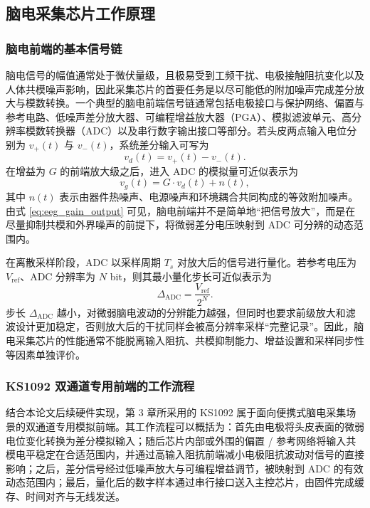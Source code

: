 \subsection{脑电采集芯片工作原理}

\subsubsection{脑电前端的基本信号链}

脑电信号的幅值通常处于微伏量级，且极易受到工频干扰、电极接触阻抗变化以及人体共模噪声影响，因此采集芯片的首要任务是以尽可能低的附加噪声完成差分放大与模数转换。一个典型的脑电前端信号链通常包括电极接口与保护网络、偏置与参考电路、低噪声差分放大器、可编程增益放大器（PGA）、模拟滤波单元、高分辨率模数转换器（ADC）以及串行数字输出接口等部分。若头皮两点输入电位分别为 $v_+(t)$ 与 $v_-(t)$，系统差分输入可写为
\begin{equation}
v_d(t) = v_+(t) - v_-(t).
\label{eq:eeg_diff_input}
\end{equation}
在增益为 $G$ 的前端放大级之后，进入 ADC 的模拟量可近似表示为
\begin{equation}
v_g(t) = G \cdot v_d(t) + n(t),
\label{eq:eeg_gain_output}
\end{equation}
其中 $n(t)$ 表示由器件热噪声、电源噪声和环境耦合共同构成的等效附加噪声。由式 \eqref{eq:eeg_gain_output} 可见，脑电前端并不是简单地“把信号放大”，而是在尽量抑制共模和外界噪声的前提下，将微弱差分电压映射到 ADC 可分辨的动态范围内。

在离散采样阶段，ADC 以采样周期 $T_s$ 对放大后的信号进行量化。若参考电压为 $V_{\mathrm{ref}}$、ADC 分辨率为 $N$ bit，则其最小量化步长可近似表示为
\begin{equation}
\Delta_{\mathrm{ADC}} = \frac{V_{\mathrm{ref}}}{2^N}.
\label{eq:adc_lsb}
\end{equation}
步长 $\Delta_{\mathrm{ADC}}$ 越小，对微弱脑电波动的分辨能力越强，但同时也要求前级放大和滤波设计更加稳定，否则放大后的干扰同样会被高分辨率采样“完整记录”。因此，脑电采集芯片的性能通常不能脱离输入阻抗、共模抑制能力、增益设置和采样同步性等因素单独评价。

\subsubsection{KS1092 双通道专用前端的工作流程}

结合本论文后续硬件实现，第 3 章所采用的 KS1092 属于面向便携式脑电采集场景的双通道专用模拟前端。其工作流程可以概括为：首先由电极将头皮表面的微弱电位变化转换为差分模拟输入；随后芯片内部或外围的偏置 / 参考网络将输入共模电平稳定在合适范围内，并通过高输入阻抗前端减小电极阻抗波动对信号的直接影响；之后，差分信号经过低噪声放大与可编程增益调节，被映射到 ADC 的有效动态范围内；最后，量化后的数字样本通过串行接口送入主控芯片，由固件完成缓存、时间对齐与无线发送。

